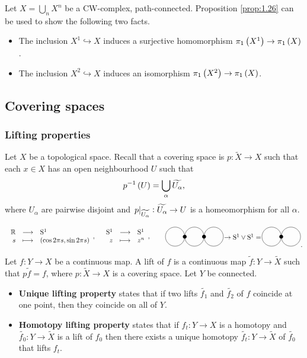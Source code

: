 \begin{remark*}
Let $ X = \bigcup_n X^n $ be a CW-complex, path-connected. Proposition \ref{prop:1.26} can be used to show the following two facts.
\begin{itemize}
\item The inclusion $ X^1 \hookrightarrow X $ induces a surjective homomorphism $ \pi_1\br{X^1} \to \pi_1\br{X} $.
\item The inclusion $ X^2 \hookrightarrow X $ induces an isomorphism $ \pi_1\br{X^2} \to \pi_1\br{X} $.
\end{itemize}
\end{remark*}

\subsection{Covering spaces}

\subsubsection{Lifting properties}

Let $ X $ be a topological space. Recall that a covering space is $ p : \widetilde{X} \to X $ such that each $ x \in X $ has an open neighbourhood $ U $ such that
$$ p^{-1}\br{U} = \bigcup_\alpha \widetilde{U_\alpha}, $$
where $ U_\alpha $ are pairwise disjoint and $ \left. p \right|_{\widetilde{U_\alpha}} : \widetilde{U_\alpha} \to U $ is a homeomorphism for all $ \alpha $.

\begin{example*}
$$
\begin{tikzpicture}
\draw (-5, 0) node{$ \function{\RR}{\S^1}{s}{\br{\cos 2\pi s, \sin 2\pi s}}, \quad \function{\S^1}{\S^1}{z}{z^n}, $};
\draw (0, 0) circle (0.5);
\fill (0.5, 0) circle (0.1);
\draw (1, 0) circle (0.5);
\fill (1.5, 0) circle (0.1);
\draw (2, 0) circle (0.5);
\draw (3.5, 0) node{$ \to \S^1 \vee \S^1 = $};
\draw (5, 0) circle (0.5);
\fill (5.5, 0) circle (0.1);
\draw (6, 0) circle (0.5);
\end{tikzpicture}.
$$
\end{example*}

Let $ f : Y \to X $ be a continuous map. A lift of $ f $ is a continuous map $ \widetilde{f} : Y \to \widetilde{X} $ such that $ p\widetilde{f} = f $, where $ p : \widetilde{X} \to X $ is a covering space. Let $ Y $ be connected.
\begin{itemize}
\item \textbf{Unique lifting property} states that if two lifts $ \widetilde{f_1} $ and $ \widetilde{f_2} $ of $ f $ coincide at one point, then they coincide on all of $ Y $.
\item \textbf{Homotopy lifting property} states that if $ f_t : Y \to X $ is a homotopy and $ \widetilde{f_0} : Y \to \widetilde{X} $ is a lift of $ f_0 $ then there exists a unique homotopy $ \widetilde{f_t} : Y \to \widetilde{X} $ of $ \widetilde{f_0} $ that lifts $ f_t $.
\end{itemize}

